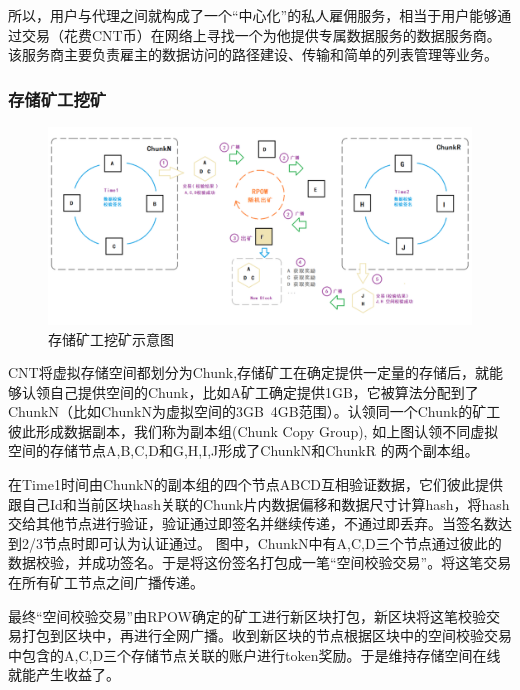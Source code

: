 \documentclass[a4paper,12pt]{article}
\begin{document}
所以，用户与代理之间就构成了一个“中心化”的私人雇佣服务，相当于用户能够通过交易（花费CNT币）在网络上寻找一个为他提供专属数据服务的数据服务商。该服务商主要负责雇主的数据访问的路径建设、传输和简单的列表管理等业务。

\subsubsection{存储矿工挖矿}


\begin {figure} [htbp]
\centering \includegraphics [width = 5in] {pic_cn/storage_mining.png}
\caption {存储矿工挖矿示意图} \label {fig: d2}
\end {figure}

CNT将虚拟存储空间都划分为Chunk,存储矿工在确定提供一定量的存储后，就能够认领自己提供空间的Chunk，比如A矿工确定提供1GB，它被算法分配到了ChunkN（比如ChunkN为虚拟空间的3GB~4GB范围）。认领同一个Chunk的矿工彼此形成数据副本，我们称为副本组(Chunk Copy Group), 如上图认领不同虚拟空间的存储节点A,B,C,D和G,H,I,J形成了ChunkN和ChunkR 的两个副本组。

在Time1时间由ChunkN的副本组的四个节点ABCD互相验证数据，它们彼此提供跟自己Id和当前区块hash关联的Chunk片内数据偏移和数据尺寸计算hash，将hash交给其他节点进行验证，验证通过即签名并继续传递，不通过即丢弃。当签名数达到2/3节点时即可认为认证通过。
图中，ChunkN中有A,C,D三个节点通过彼此的数据校验，并成功签名。于是将这份签名打包成一笔“空间校验交易”。将这笔交易在所有矿工节点之间广播传递。

最终“空间校验交易”由RPOW确定的矿工进行新区块打包，新区块将这笔校验交易打包到区块中，再进行全网广播。收到新区块的节点根据区块中的空间校验交易中包含的A,C,D三个存储节点关联的账户进行token奖励。于是维持存储空间在线就能产生收益了。
\end{document}
